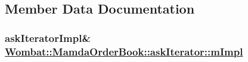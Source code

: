 \subsection{Member Data Documentation}
\hypertarget{classWombat_1_1MamdaOrderBook_1_1askIterator_fb11f11803a10f1997bc1305570e0b6c}{
\subsubsection[mImpl]{\setlength{\rightskip}{0pt plus 5cm}ask\-Iterator\-Impl\& \hyperlink{classWombat_1_1MamdaOrderBook_1_1askIterator_fb11f11803a10f1997bc1305570e0b6c}{Wombat::Mamda\-Order\-Book::ask\-Iterator::m\-Impl}}}
\label{classWombat_1_1MamdaOrderBook_1_1askIterator_fb11f11803a10f1997bc1305570e0b6c}


